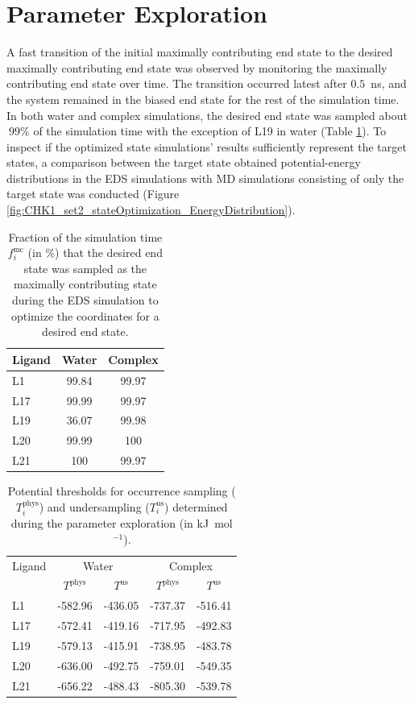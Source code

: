 \section{Parameter Exploration}
A fast transition of the initial maximally contributing end state to the desired maximally contributing end state was observed by monitoring the maximally contributing end state over time.
The transition occurred latest after $0.5$~ns, and the system remained in the biased end state for the rest of the simulation time.
In both water and complex simulations, the desired end state was sampled about $~99\%$ of the simulation time with the exception of L19 in water (Table \ref{SItab:RingCycleOpenin_sampling_fraction_optimizedStates}).
To inspect if the optimized state simulations' results sufficiently represent the target states, a comparison between the target state obtained potential-energy distributions in the EDS simulations with MD simulations consisting of only the target state was conducted (Figure \ref{fig:CHK1_set2_stateOptimization_EnergyDistribution}). 

\begin{table}[H]
\centering
\caption{Fraction of the simulation time $f_i^{\text{mc}}$ (in \%) that the desired end state was sampled as the maximally contributing state during the EDS simulation to optimize the coordinates for a desired end state.}
\label{SItab:RingCycleOpenin_sampling_fraction_optimizedStates}
\begin{tabular}{ l | c c }
 Ligand & Water  & Complex \\ 
 \hline
     L1 & 99.84 & 99.97 \\ 
     L17 & 99.99 & 99.97\\
     L19 & 36.07 &  99.98\\
     L20 & 99.99 & 100\\
     L21 & 100 & 99.97 \\
\end{tabular}
\end{table}

\begin{table}[H]
\centering
\caption{Potential thresholds for occurrence sampling ($T_{i}^{\text{phys}}$) and undersampling ($T_{i}^{\text{us}}$) determined during the parameter exploration (in kJ~mol$^{-1}$).}
\label{SItab:RingCycleOpenin_PotentialTresholds}
\begin{tabular}{ l | c c |c c| }
 Ligand &\multicolumn{2}{c|}{Water} & \multicolumn{2}{c|}{Complex}\\ 
  & \multicolumn{1}{c}{$T^{\text{phys}}$}& \multicolumn{1}{c|}{$T^{\text{us}}$}&  \multicolumn{1}{c}{$T^{\text{phys}}$}& \multicolumn{1}{c|}{$T^{\text{us}}$} \\ 
 \hline
     L1  & -582.96 & -436.05 & -737.37 & -516.41\\ 
     L17 & -572.41 & -419.16 & -717.95 & -492.83\\
     L19 & -579.13 & -415.91 & -738.95 & -483.78\\
     L20 & -636.00 & -492.75 & -759.01 & -549.35\\
     L21 & -656.22 & -488.43 & -805.30 & -539.78\\
\end{tabular}
\end{table}

